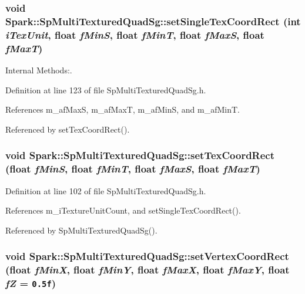 \subsubsection{\setlength{\rightskip}{0pt plus 5cm}void Spark::Sp\-Multi\-Textured\-Quad\-Sg::set\-Single\-Tex\-Coord\-Rect (int {\em i\-Tex\-Unit}, float {\em f\-Min\-S}, float {\em f\-Min\-T}, float {\em f\-Max\-S}, float {\em f\-Max\-T})\hspace{0.3cm}{\tt  [inline, protected]}}\label{classSpark_1_1SpMultiTexturedQuadSg_b0}


Internal Methods:. 

Definition at line 123 of file Sp\-Multi\-Textured\-Quad\-Sg.h.

References m\_\-af\-Max\-S, m\_\-af\-Max\-T, m\_\-af\-Min\-S, and m\_\-af\-Min\-T.

Referenced by set\-Tex\-Coord\-Rect().
\subsubsection{\setlength{\rightskip}{0pt plus 5cm}void Spark::Sp\-Multi\-Textured\-Quad\-Sg::set\-Tex\-Coord\-Rect (float {\em f\-Min\-S}, float {\em f\-Min\-T}, float {\em f\-Max\-S}, float {\em f\-Max\-T})\hspace{0.3cm}{\tt  [inline]}}\label{classSpark_1_1SpMultiTexturedQuadSg_a3}


Definition at line 102 of file Sp\-Multi\-Textured\-Quad\-Sg.h.

References m\_\-i\-Texture\-Unit\-Count, and set\-Single\-Tex\-Coord\-Rect().

Referenced by Sp\-Multi\-Textured\-Quad\-Sg().
\subsubsection{\setlength{\rightskip}{0pt plus 5cm}void Spark::Sp\-Multi\-Textured\-Quad\-Sg::set\-Vertex\-Coord\-Rect (float {\em f\-Min\-X}, float {\em f\-Min\-Y}, float {\em f\-Max\-X}, float {\em f\-Max\-Y}, float {\em f\-Z} = {\tt 0.5f})\hspace{0.3cm}{\tt  [inline]}}\label{classSpark_1_1SpMultiTexturedQuadSg_a4}


